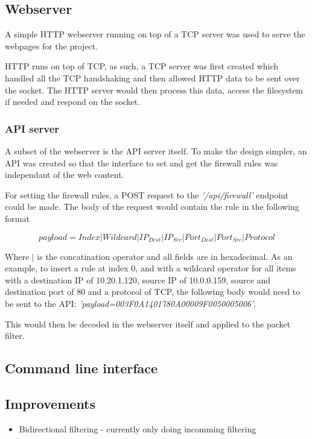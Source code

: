 \subsection{Webserver}
A simple HTTP webserver running on top of a TCP server was used to serve the webpages for the project. 

HTTP runs on top of TCP, as such, a TCP server was first created which handled all the TCP handshaking and then allowed HTTP data to be sent over the socket. The HTTP server would then process this data, access the filesystem if needed and respond on the socket. 


\subsubsection{API server}
A subset of the webserver is the API server itself. To make the design simpler, an API was created so that the interface to set and get the firewall rules was independant of the web content.

For setting the firewall rules, a POST request to the \textit{'/api/firewall'} endpoint could be made. The body of the request would contain the rule in the following format

\[
payload=Index | Wildcard | IP_{Dest} |  IP_{Src}  | Port_{Dest} |  Port_{Src} | Protocol
\]

Where $|$ is the concatination operator and all fields are in hexadecimal. As an example, to insert a rule at index 0, and with a wildcard operator for all items with a destination IP of 10.20.1.120, source IP of 10.0.0.159, source and destination port of 80 and a protocol of TCP, the following body would need to be sent to the API: \textit{'payload=003F0A1401780A00009F0050005006'}.

This would then be decoded in the webserver itself and applied to the packet filter. 




\subsection{Command line interface}


\subsection{Improvements}

\begin{itemize}
    \item Bidirectional filtering - currently only doing incomming filtering
\end{itemize}